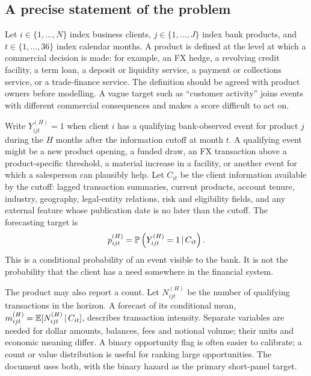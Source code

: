 \subsection{A precise statement of the problem}

Let $i\in\{1,\ldots,N\}$ index business clients, $j\in\{1,\ldots,J\}$ index bank products, and $t\in\{1,\ldots,36\}$ index calendar months. A product is defined at the level at which a commercial decision is made: for example, an FX hedge, a revolving credit facility, a term loan, a deposit or liquidity service, a payment or collections service, or a trade-finance service. The definition should be agreed with product owners before modelling. A vague target such as ``customer activity'' joins events with different commercial consequences and makes a score difficult to act on.

Write $Y_{ijt}^{(H)}=1$ when client $i$ has a qualifying bank-observed event for product $j$ during the $H$ months after the information cutoff at month $t$. A qualifying event might be a new product opening, a funded draw, an FX transaction above a product-specific threshold, a material increase in a facility, or another event for which a salesperson can plausibly help. Let $C_{it}$ be the client information available by the cutoff: lagged transaction summaries, current products, account tenure, industry, geography, legal-entity relations, risk and eligibility fields, and any external feature whose publication date is no later than the cutoff. The forecasting target is
\begin{equation}
 p_{ijt}^{(H)}=\mathbb{P}\left(Y_{ijt}^{(H)}=1\,|\, C_{it}\right).
 \label{eq:forecast-target}
\end{equation}
 This is a conditional probability of an event visible to the bank. It is not the probability that the client has a need somewhere in the financial system.

The product may also report a count. Let $N_{ijt}^{(H)}$ be the number of qualifying transactions in the horizon. A forecast of its conditional mean, $m_{ijt}^{(H)}=\mathbb{E}[N_{ijt}^{(H)}\,|\, C_{it}]$, describes transaction intensity. Separate variables are needed for dollar amounts, balances, fees and notional volume; their units and economic meaning differ. A binary opportunity flag is often easier to calibrate; a count or value distribution is useful for ranking large opportunities. The document uses both, with the binary hazard as the primary short-panel target.

